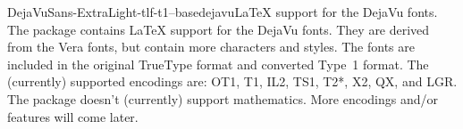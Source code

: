 \documentclass{ddltxtyp}
\begin{document}


\begin{package}{DejaVuSans-ExtraLight-tlf-t1--base}{dejavu}{{\LaTeX} support for the DejaVu fonts.}
The package contains {\LaTeX} support for the DejaVu fonts. They
are derived from the Vera fonts, but contain more characters
and styles. The fonts are included in the original TrueType
format and converted Type~1 format. The (currently) supported
encodings are: OT1, T1, IL2, TS1, T2*, X2, QX, and LGR. The
package doesn't (currently) support mathematics. More encodings
and/or features will come later.
\end{package}

\end{document}
